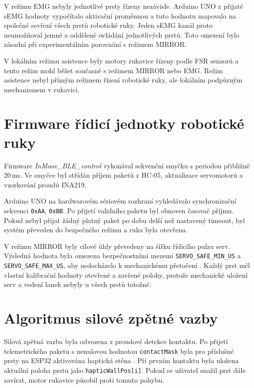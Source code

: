V režimu EMG nebyly jednotlivé prsty řízeny nezávisle. Arduino UNO z přijaté sEMG hodnoty vypočítalo aktivační proměnnou a tuto hodnotu mapovalo na společné sevření všech prstů robotické ruky. Jeden sEMG kanál proto neumožňoval jemné a oddělené ovládání jednotlivých prstů. Toto omezení bylo zásadní při experimentálním porovnání s režimem MIRROR\@.

V lokálním režimu asistence byly motory rukavice řízeny podle FSR senzorů a tento režim mohl běžet současně s režimem MIRROR nebo EMG\@. Režim asistence nebyl přímým režimem řízení robotické ruky, ale lokálním podpůrným mechanismem v rukavici.

\section{Firmware řídicí jednotky robotické ruky}
\label{sec:firmware-roboticke-ruky}

Firmware \textit{InMoov\_BLE\_control} vykonával sekvenční smyčku s periodou přibližně 20\,ms. Ve smyčce byl střídán příjem paketů z HC-05, aktualizace servomotorů a vzorkování proudů INA219.

Arduino UNO na hardwarovém sériovém rozhraní vyhledávalo synchronizační sekvenci \texttt{0xAA}, \texttt{0xBB}. Po přijetí validního paketu byl obnoven časovač příjmu. Pokud nebyl přijat žádný platný paket po dobu delší než nastavený timeout, byl systém převeden do bezpečného režimu a ruka byla otevřena.

V režimu MIRROR byly cílové úhly převedeny na šířku řídicího pulzu serv. Výsledná hodnota byla omezena bezpečnostními mezemi \texttt{SERVO\_SAFE\_MIN\_US} a \texttt{SERVO\_SAFE\_MAX\_US}, aby nedocházelo k mechanickému přetočení \cite{Krycner2024}. Každý prst měl vlastní kalibrační hodnoty otevřené a zavřené polohy, protože mechanické uložení serv a vedení lanek nebyly u všech prstů totožné.

\section{Algoritmus silové zpětné vazby}
\label{sec:algoritmus-force-feedback}

Silová zpětná vazba byla odvozena z proudové detekce kontaktu. Po přijetí telemetrického paketu s nenulovou hodnotou \texttt{contactMask} byla pro příslušné prsty na ESP32 aktivována haptická stěna \cite{Begalinova2020,Fang2022}. Při prvním kontaktu byla uložena aktuální poloha prstu jako \texttt{hapticWallPos[i]}. Pokud se uživatel snažil prst dále zavírat, motor rukavice působil proti tomuto pohybu.

